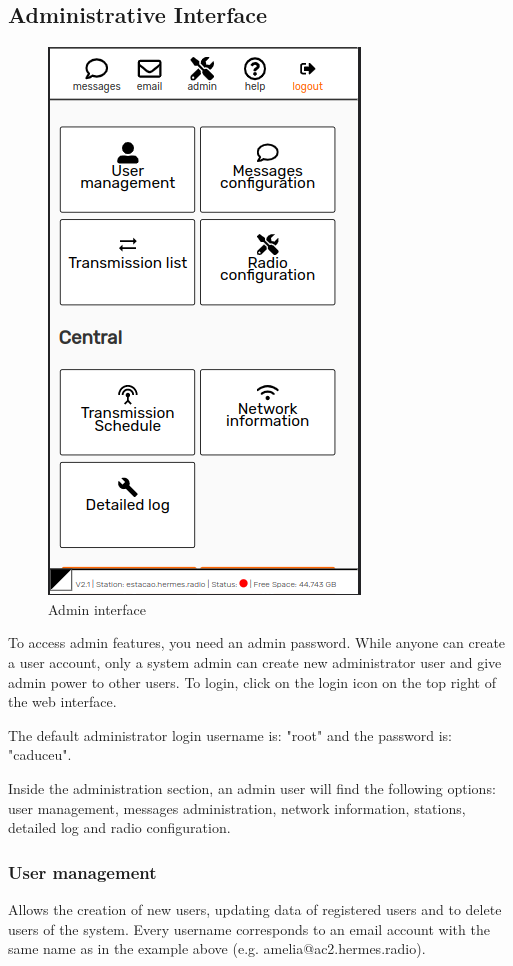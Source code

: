 \documentclass[11pt,a4paper]{article}
\begin{document}
\subsection{Administrative Interface}
\label{admininterface}

\begin{figure}[H]
    \centering
    \includegraphics[width=0.5\columnwidth]{screenshots/frontend/en/admin.png}
    \caption{Admin interface}
    \label{fig:admin}
\end{figure}

To access admin features, you need an admin password. While anyone can create a user account, only a system admin can create new administrator user and give admin power to other users. To login, click on the login icon on the top right of the web interface. 

The default administrator login username is: "root" and the password is: "caduceu".

Inside the administration section, an admin user will find the following options: user management, messages administration, network information, stations, detailed log and radio configuration.

\subsubsection{User management} 

Allows the creation of new users, updating data of registered users and to delete users of the system. Every username corresponds to an email account with the same name as in the example above (e.g. amelia@ac2.hermes.radio). 
    
\end{document}
